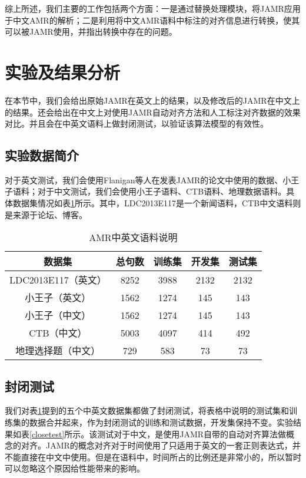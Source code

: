 \documentclass[master, winfont]{njuthesis}
\begin{document}
综上所述，我们主要的工作包括两个方面：一是通过替换处理模块，将JAMR应用于中文AMR的解析；二是利用将中文AMR语料中标注的对齐信息进行转换，使其可以被JAMR使用，并指出转换中存在的问题。

\section{实验及结果分析}
在本节中，我们会给出原始JAMR在英文上的结果，以及修改后的JAMR在中文上的结果。还会给出在中文上对使用JAMR自动对齐方法和人工标注对齐数据的效果对比。并且会在中英文语料上做封闭测试，以验证该算法模型的有效性。

\subsection{实验数据简介}
对于英文测试，我们会使用Flanigan等人\cite{Flanigan2014}在发表JAMR的论文中使用的数据、小王子语料；对于中文测试，我们会使用小王子语料、CTB语料、地理数据语料。具体数据集情况如表\ref{amrdatas}所示。其中，LDC2013E117是一个新闻语料，CTB中文语料则是来源于论坛、博客。

\begin{table}[!htbp]
\begin{center}
\begin{tabular}{c|c|c|c|c}
\hline {数据集} & {总句数} & {训练集} & {开发集} & {测试集} \\
\hline LDC2013E117（英文） & 8252 & 3988 & 2132 & 2132 \\
\hline 小王子（英文） & 1562 & 1274 & 145 & 143 \\
\hline 小王子（中文） & 1562 & 1274 & 145 & 143 \\
\hline CTB（中文） & 5003 & 4097 & 414 & 492 \\
\hline 地理选择题（中文） & 729 & 583 & 73 & 73 \\
\hline
\end{tabular}
\end{center}
\caption{\label{amrdatas} AMR中英文语料说明}
\end{table}

\subsection{封闭测试}
我们对表\ref{amrdatas}提到的五个中英文数据集都做了封闭测试，将表格中说明的测试集和训练集的数据合并起来，作为封闭测试的训练和测试数据，开发集保持不变。实验结果如表\ref{closetest}所示。该测试对于中文，是使用JAMR自带的自动对齐算法做概念的对齐。JAMR的概念对齐对于时间使用了只适用于英文的一套正则表达式，并不能直接在中文中使用。但是在语料中，时间所占的比例还是非常小的，所以暂时可以忽略这个原因给性能带来的影响。
\end{document}
